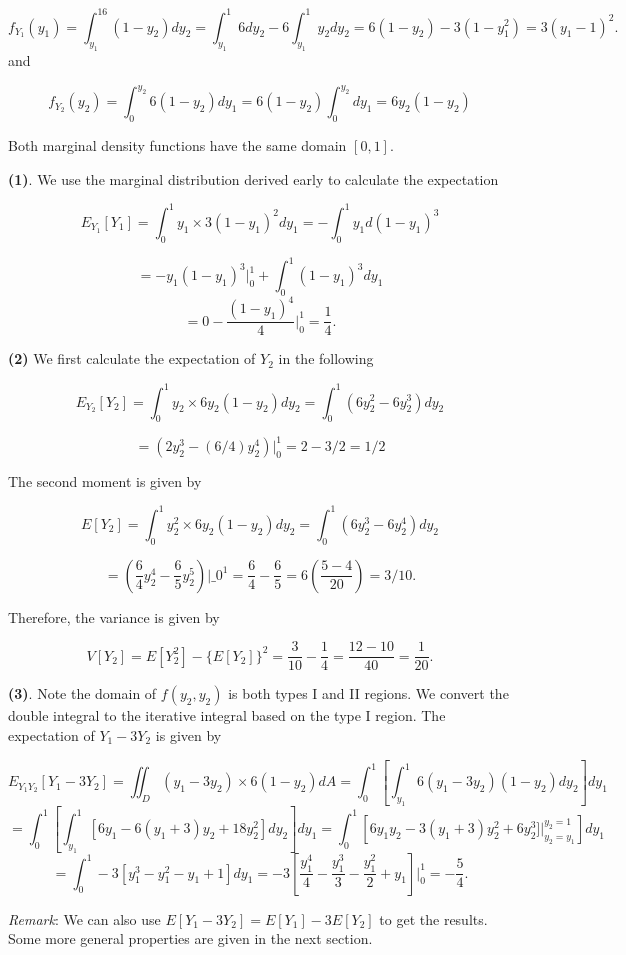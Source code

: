 \documentclass[
]{book}
\begin{document}
\[
f_{Y_1}(y_1) = \int_{y_1}^16(1-y_2) dy_2 = \int_{y_1}^1 6dy_2 - 6\int_{y_1}^1y_2dy_2 = 6(1-y_2)-3(1-y_1^2) = 3(y_1-1)^2.
\]
and

\[
f_{Y_2}(y_2) = \int_0^{y_2} 6(1-y_2)dy_1 = 6(1-y_2)\int_0^{y_2}dy_1 = 6y_2(1-y_2)
\]

Both marginal density functions have the same domain \([0, 1]\).

\textbf{(1)}. We use the marginal distribution derived early to calculate the expectation

\[
E_{Y_1}[Y_1] = \int_0^1 y_1\times 3(1-y_1)^2dy_1 = -\int_0^1 y_1d (1-y_1)^3 
\]

\[
= -y_1(1-y_1)^3\Big|_0^1+\int_0^1 (1-y_1)^3dy_1 
\]
\[
= 0 -  \frac{(1-y_1)^4}{4}\Big|_0^1 = \frac{1}{4}.
\]

\textbf{(2)} We first calculate the expectation of \(Y_2\) in the following

\[
E_{Y_2}[Y_2] = \int_0^1 y_2\times 6y_2(1-y_2) dy_2 = \int_0^1 (6y_2^2 - 6y_2^3)dy_2
\]

\[
=(2y_2^3-(6/4)y_2^4)\Big|_0^1 = 2-3/2 = 1/2
\]

The second moment is given by

\[
E[Y_2] = \int_0^1 y_2^2\times 6y_2(1-y_2) dy_2 = \int_0^1 (6y_2^3-6y_2^4)dy_2
\]

\[
=(\frac{6}{4}y_2^4 -\frac{6}{5}y_2^5)\Big|\_0^1 = \frac{6}{4}-\frac{6}{5} = 6(\frac{5-4}{20}) = 3/10.
\]

Therefore, the variance is given by

\[
V[Y_2] = E[Y_2^2] - \{E[Y_2] \}^2 = \frac{3}{10} - \frac{1}{4} = \frac{12-10}{40} = \frac{1}{20}.
\]

\textbf{(3)}. Note the domain of \(f(y_2, y_2)\) is both types I and II regions. We convert the double integral to the iterative integral based on the type I region. The expectation of \(Y_1-3Y_2\) is given by

\[
E_{Y_1Y_2}[Y_1-3Y_2] = \iint_D (y_1-3y_2)\times 6(1-y_2) dA = \int_0^1 \left[\int_{y_1}^1 6(y_1-3y_2)(1-y_2)dy_2\right]dy_1
\]
\[
=  \int_0^1 \left[\int_{y_1}^1 [6y_1-6(y_1+3)y_2 + 18y_2^2] dy_2\right]dy_1 =\int_0^1  \left[6y_1y_2-3(y_1+3)y_2^2 + 6y_2^3]\Big|_{y_2=y_1}^{y_2=1} \right]dy_1 
\]
\[
=\int_0^1  -3\left[y_1^3 -y_1^2 -y_1 +1 \right]dy_1 = -3\left[\frac{y_1^4}{4} - \frac{y_1^3}{3} -\frac{y_1^2}{2}+y_1 \right]\Bigg|_0^1 = -\frac{5}{4}.
\]

\hfill\break

\emph{Remark}: We can also use \(E[Y_1 - 3Y_2] = E[Y_1] -3E[Y_2]\) to get the results. Some more general properties are given in the next section.
\end{document}

